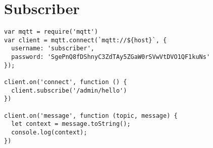 \newpage
\section{Subscriber}
\begin{footnotesize}
\begin{verbatim}
var mqtt = require('mqtt')
var client = mqtt.connect(`mqtt://${host}`, {
  username: 'subscriber',
  password: 'SgePnQ8fDShnyC3ZdTAy5ZGaW0rSVwVtDVO1QF1kuNs'
});

client.on('connect', function () {
  client.subscribe('/admin/hello')
})

client.on('message', function (topic, message) {
  let context = message.toString();
  console.log(context);
})
\end{verbatim}
\end{footnotesize}

\newpage

